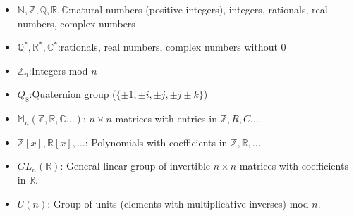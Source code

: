 \begin{itemize}
\item[]
$\mathbb{ N, Z,Q,R,C}$:\quad natural numbers (positive integers), integers, rationals, real numbers, complex numbers
\item[]
$\mathbb{ Q^{\ast},R^{\ast},C^{\ast}}$:\quad  rationals, real numbers, complex numbers without $0$
\item[]
${\mathbb Z}_n$:\quad Integers mod $n$
\item[]
$Q_8$:\quad Quaternion group ($ \{ \pm 1, \pm i, \pm j, \pm j  \pm k \}$)
\item[]
${\mathbb M}_n(\mathbb{ Z,R,C}\ldots)$: \quad $n \times n$ matrices with entries in ${\mathbb Z,R,C}\ldots$.
\item[]
${\mathbb Z}[x],{\mathbb R}[x], \ldots$: \quad Polynomials with coefficients in ${\mathbb Z},{\mathbb R}, \ldots$.
\item[]
$GL_n({\mathbb R})$: \quad General linear group of invertible $n \times n$ matrices with coefficients in ${\mathbb R}$.
\item[]
$U(n)$: \quad Group of units (elements with multiplicative inverses) mod $n$.
\end{itemize}

